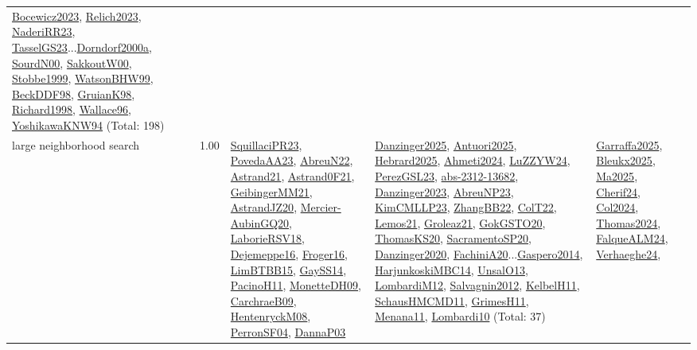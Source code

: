 {\begin{longtable}{p{3cm}r>{\raggedright\arraybackslash}p{6cm}>{\raggedright\arraybackslash}p{6cm}>{\raggedright\arraybackslash}p{8cm}}
\hyperref[detail:Bocewicz2023]{Bocewicz2023}, \hyperref[detail:Relich2023]{Relich2023}, \hyperref[detail:NaderiRR23]{NaderiRR23}, \hyperref[detail:TasselGS23]{TasselGS23}...\hyperref[detail:Dorndorf2000a]{Dorndorf2000a}, \hyperref[detail:SourdN00]{SourdN00}, \hyperref[detail:SakkoutW00]{SakkoutW00}, \hyperref[detail:Stobbe1999]{Stobbe1999}, \hyperref[detail:WatsonBHW99]{WatsonBHW99}, \hyperref[detail:BeckDDF98]{BeckDDF98}, \hyperref[detail:GruianK98]{GruianK98}, \hyperref[detail:Richard1998]{Richard1998}, \hyperref[detail:Wallace96]{Wallace96}, \hyperref[detail:YoshikawaKNW94]{YoshikawaKNW94} (Total: 198)\\
\index{large neighborhood search}\index{Algorithms!large neighborhood search}large neighborhood search &  1.00 & \hyperref[detail:SquillaciPR23]{SquillaciPR23}, \hyperref[detail:PovedaAA23]{PovedaAA23}, \hyperref[detail:AbreuN22]{AbreuN22}, \hyperref[detail:Astrand21]{Astrand21}, \hyperref[detail:Astrand0F21]{Astrand0F21}, \hyperref[detail:GeibingerMM21]{GeibingerMM21}, \hyperref[detail:AstrandJZ20]{AstrandJZ20}, \hyperref[detail:Mercier-AubinGQ20]{Mercier-AubinGQ20}, \hyperref[detail:LaborieRSV18]{LaborieRSV18}, \hyperref[detail:Dejemeppe16]{Dejemeppe16}, \hyperref[detail:Froger16]{Froger16}, \hyperref[detail:LimBTBB15]{LimBTBB15}, \hyperref[detail:GaySS14]{GaySS14}, \hyperref[detail:PacinoH11]{PacinoH11}, \hyperref[detail:MonetteDH09]{MonetteDH09}, \hyperref[detail:CarchraeB09]{CarchraeB09}, \hyperref[detail:HentenryckM08]{HentenryckM08}, \hyperref[detail:PerronSF04]{PerronSF04}, \hyperref[detail:DannaP03]{DannaP03} & \hyperref[detail:Danzinger2025]{Danzinger2025}, \hyperref[detail:Antuori2025]{Antuori2025}, \hyperref[detail:Hebrard2025]{Hebrard2025}, \hyperref[detail:Ahmeti2024]{Ahmeti2024}, \hyperref[detail:LuZZYW24]{LuZZYW24}, \hyperref[detail:PerezGSL23]{PerezGSL23}, \hyperref[detail:abs-2312-13682]{abs-2312-13682}, \hyperref[detail:Danzinger2023]{Danzinger2023}, \hyperref[detail:AbreuNP23]{AbreuNP23}, \hyperref[detail:KimCMLLP23]{KimCMLLP23}, \hyperref[detail:ZhangBB22]{ZhangBB22}, \hyperref[detail:ColT22]{ColT22}, \hyperref[detail:Lemos21]{Lemos21}, \hyperref[detail:Groleaz21]{Groleaz21}, \hyperref[detail:GokGSTO20]{GokGSTO20}, \hyperref[detail:ThomasKS20]{ThomasKS20}, \hyperref[detail:SacramentoSP20]{SacramentoSP20}, \hyperref[detail:Danzinger2020]{Danzinger2020}, \hyperref[detail:FachiniA20]{FachiniA20}...\hyperref[detail:Gaspero2014]{Gaspero2014}, \hyperref[detail:HarjunkoskiMBC14]{HarjunkoskiMBC14}, \hyperref[detail:UnsalO13]{UnsalO13}, \hyperref[detail:LombardiM12]{LombardiM12}, \hyperref[detail:Salvagnin2012]{Salvagnin2012}, \hyperref[detail:KelbelH11]{KelbelH11}, \hyperref[detail:SchausHMCMD11]{SchausHMCMD11}, \hyperref[detail:GrimesH11]{GrimesH11}, \hyperref[detail:Menana11]{Menana11}, \hyperref[detail:Lombardi10]{Lombardi10} (Total: 37) & \hyperref[detail:Garraffa2025]{Garraffa2025}, \hyperref[detail:Bleukx2025]{Bleukx2025}, \hyperref[detail:Ma2025]{Ma2025}, \hyperref[detail:Cherif24]{Cherif24}, \hyperref[detail:Col2024]{Col2024}, \hyperref[detail:Thomas2024]{Thomas2024}, \hyperref[detail:FalqueALM24]{FalqueALM24}, \hyperref[detail:Verhaeghe24]{Verhaeghe24}, 
\end{longtable}}
